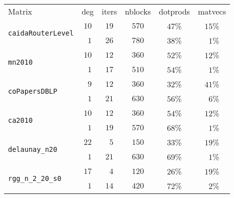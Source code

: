 \begin{tabular}{l|c|c|c|c|c}
\hline
\multirow{2}{*}{Matrix} & \multirow{2}{*}{deg} & \multirow{2}{*}{iters} & \multirow{2}{*}{nblocks} & \multirow{2}{*}{dotprods}& \multirow{2}{*}{matvecs} \\
 & & & & & \\\hline
\hline
\multirow{2}{*}{\texttt{caidaRouterLevel}} & $10$ & $19$ & $570$ & $47$\% & $15$\%\\
  & $\phantom{0}1$ & $26$ & $780$ & $38$\% & $\phantom{0}1$\%\\\hline
\multirow{2}{*}{\texttt{mn2010}} & $10$ & $12$ & $360$ & $52$\% & $12$\%\\
  & $\phantom{0}1$ & $17$ & $510$ & $54$\% & $\phantom{0}1$\%\\\hline
\multirow{2}{*}{\texttt{coPapersDBLP}} & $\phantom{0}9$ & $12$ & $360$ & $32$\% & $41$\%\\
  & $\phantom{0}1$ & $21$ & $630$ & $56$\% & $\phantom{0}6$\%\\\hline
\multirow{2}{*}{\texttt{ca2010}} & $10$ & $12$ & $360$ & $54$\% & $12$\%\\
  & $\phantom{0}1$ & $19$ & $570$ & $68$\% & $\phantom{0}1$\%\\\hline
\multirow{2}{*}{\texttt{delaunay\_n20}} & $22$ & $\phantom{0}5$ & $150$ & $33$\% & $19$\%\\
  & $\phantom{0}1$ & $21$ & $630$ & $69$\% & $\phantom{0}1$\%\\\hline
\multirow{2}{*}{\texttt{rgg\_n\_2\_20\_s0}} & $17$ & $\phantom{0}4$ & $120$ & $26$\% & $19$\%\\
  & $\phantom{0}1$ & $14$ & $420$ & $72$\% & $\phantom{0}2$\%\\\hline
\end{tabular}